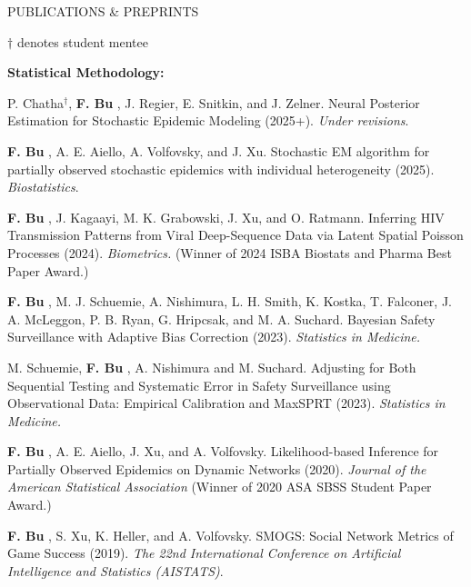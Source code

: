 \documentclass{resume} %
\newcommand{\thisYear}[1]{
	#1
}
\newcommand{\myName}[1]{
	\textbf{#1}
}
\begin{document}


\begin{rSection}{PUBLICATIONS \& PREPRINTS}

{\footnotesize $\dagger$ denotes student mentee}

\hspace{-.2in} \textbf{Statistical Methodology:}

P. Chatha$^\dagger$, \myName{F. Bu}, J. Regier, E. Snitkin, and J. Zelner. 
Neural Posterior Estimation for Stochastic Epidemic Modeling (2025+). \emph{Under revisions}.	%

\smallskip

\thisYear{
\myName{F. Bu}, A. E. Aiello, A. Volfovsky, and J. Xu.  
Stochastic EM algorithm for partially observed stochastic epidemics with individual heterogeneity (2025).  \emph{Biostatistics}.%
}

\smallskip

\myName{F. Bu}, J. Kagaayi, M. K. Grabowski, J. Xu, and O. Ratmann.
Inferring HIV Transmission Patterns from Viral Deep-Sequence Data via Latent Spatial Poisson Processes (2024). \emph{Biometrics.} 
(Winner of 2024 ISBA Biostats and Pharma Best Paper Award.)

\smallskip

\myName{F. Bu}, M. J. Schuemie,  A. Nishimura, L. H. Smith, K. Kostka, T. Falconer, J. A. McLeggon, P. B. Ryan, G. Hripcsak, and M. A. Suchard.
Bayesian Safety Surveillance with Adaptive Bias Correction (2023). \emph{Statistics in Medicine.} %

\smallskip


M. Schuemie, \myName{F. Bu}, A. Nishimura and M. Suchard.
Adjusting for Both Sequential Testing and Systematic Error in Safety Surveillance using Observational Data: Empirical Calibration and MaxSPRT (2023). \emph{Statistics in Medicine.}

\smallskip


\myName{F. Bu}, A. E. Aiello, J. Xu, and A. Volfovsky. 
Likelihood-based Inference for Partially Observed Epidemics on Dynamic Networks (2020). \emph{Journal of the American Statistical Association} (Winner of 2020 ASA SBSS Student Paper Award.) %

\smallskip

\myName{F. Bu}, S. Xu, K. Heller, and A. Volfovsky. 
SMOGS: Social Network Metrics of Game Success (2019). \emph{The 22nd International Conference on Artificial Intelligence and Statistics (AISTATS)}. %


\end{rSection}
\end{document}
